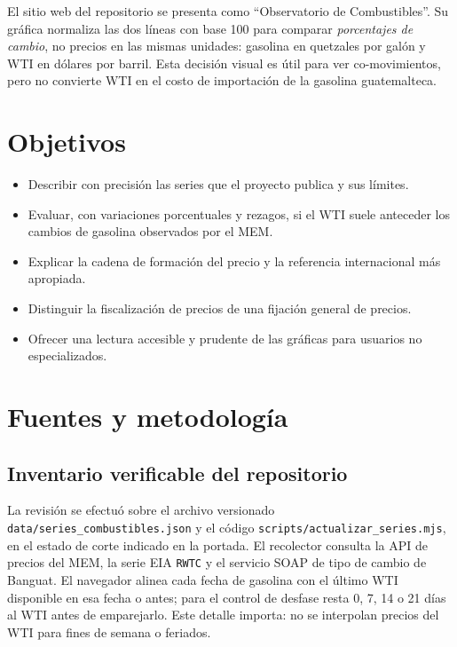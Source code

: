 \documentclass[11pt,letterpaper]{article}
\begin{document}
El sitio web del repositorio se presenta como ``Observatorio de Combustibles''. Su gráfica normaliza las dos líneas con base 100 para comparar \emph{porcentajes de cambio}, no precios en las mismas unidades: gasolina en quetzales por galón y WTI en dólares por barril. Esta decisión visual es útil para ver co-movimientos, pero no convierte WTI en el costo de importación de la gasolina guatemalteca.

\section{Objetivos}
\begin{itemize}
  \item Describir con precisión las series que el proyecto publica y sus límites.
  \item Evaluar, con variaciones porcentuales y rezagos, si el WTI suele anteceder los cambios de gasolina observados por el MEM.
  \item Explicar la cadena de formación del precio y la referencia internacional más apropiada.
  \item Distinguir la fiscalización de precios de una fijación general de precios.
  \item Ofrecer una lectura accesible y prudente de las gráficas para usuarios no especializados.
\end{itemize}

\section{Fuentes y metodología}
\subsection{Inventario verificable del repositorio}
La revisión se efectuó sobre el archivo versionado \texttt{data/series\_combustibles.json} y el código \texttt{scripts/actualizar\_series.mjs}, en el estado de corte indicado en la portada. El recolector consulta la API de precios del MEM, la serie EIA \texttt{RWTC} y el servicio SOAP de tipo de cambio de Banguat. El navegador alinea cada fecha de gasolina con el último WTI disponible en esa fecha o antes; para el control de desfase resta 0, 7, 14 o 21 días al WTI antes de emparejarlo. Este detalle importa: no se interpolan precios del WTI para fines de semana o feriados.
\end{document}

